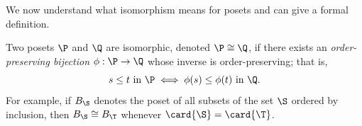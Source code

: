 We now understand what isomorphism means for posets and can give a formal
definition.
\begin{definition}
Two posets $\P$ and $\Q$ are isomorphic, denoted $\P \cong \Q$, if
there exists an \emph{order-preserving bijection} $\phi : \P \to \Q$ whose
inverse is order-preserving; that is,
\begin{displaymath}
s \leq t~\text{in}~\P \iff \phi(s) \leq \phi(t)~\text{in}~\Q.
\end{displaymath}
For example, if $B_{\S}$ denotes the poset of all subsets
of the set $\S$ ordered by inclusion, then $B_{\S} \cong B_{\T}$ whenever $\card{\S} =
\card{\T}$.
\end{definition}

